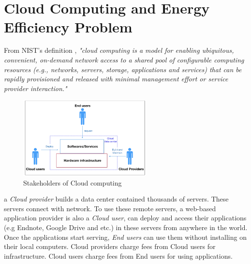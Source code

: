\section{Cloud Computing and Energy Efficiency Problem}
\label{sec:background}


 From NIST's definition \cite{Mell:2011jj}, \textit{"cloud computing is a model for enabling ubiquitous, convenient, on-demand network access to a shared pool of configurable computing resources (e.g., networks, servers, storage, applications and services) that can be rapidly provisioned and released with minimal management effort or service provider interaction."}

\begin{figure}
	\centering
	\includegraphics[width=0.6\textwidth]{pics/stakeholders.png}
	\caption{Stakeholders of Cloud computing \cite{Jennings:2015ht}}
	\label{fig:stakeholders}
\end{figure}

 a \emph{Cloud provider} builds a data center contained thousands of servers. These servers connect with network. 
To use these remote servers, a web-based application provider is also a \emph{Cloud user}, can deploy and access their applications (e.g Endnote, Google Drive and etc.) in these servers from anywhere in the world. Once the applications start serving, \emph{End users} can use them without installing on their local computers. Cloud providers charge fees from Cloud users for infrastructure. Cloud users charge fees from End users for using applications. 

